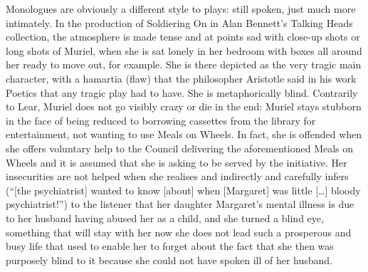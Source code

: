 \documentclass[a4paper]{article}
\begin{document}
Monologues are obviously a different style to plays: still spoken, just much more intimately. In the production of Soldiering On in Alan Bennett's Talking Heads collection, the atmosphere is made tense and at points sad with close-up shots or long shots of Muriel, when she is sat lonely in her bedroom with boxes all around her ready to move out, for example. She is there depicted as the very tragic main character, with a hamartia (flaw) that the philosopher Aristotle said in his work Poetics that any tragic play had to have. She is metaphorically blind. Contrarily to Lear, Muriel does not go visibly crazy or die in the end: Muriel stays stubborn in the face of being reduced to borrowing cassettes from the library for entertainment, not wanting to use Meals on Wheels. In fact, she is offended when she offers voluntary help to the Council delivering the aforementioned Meals on Wheels and it is assumed that she is asking to be served by the initiative. Her insecurities are not helped when she realises and indirectly and carefully infers (``[the psychiatrist] wanted to know [about] when [Margaret] was little [\ldots] bloody psychiatrist!'') to the listener that her daughter Margaret's mental illness is due to her husband having abused her as a child, and she turned a blind eye, something that will stay with her now she does not lead such a prosperous and busy life that used to enable her to forget about the fact that she then was purposely blind to it because she could not have spoken ill of her husband.
\end{document}
